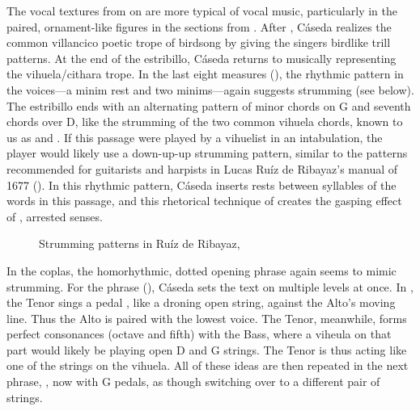 The vocal textures from  on are more typical of vocal music,
particularly in the paired, ornament-like figures in the sections from
.
After , Cáseda realizes the common villancico poetic trope of
birdsong by giving the singers birdlike trill patterns. 
At the end of the estribillo, Cáseda returns to musically representing the
vihuela/cithara trope.
In the last eight measures (), the rhythmic pattern in the
voices---a minim rest and two minims---again suggests strumming (see
 below).
The estribillo ends with an alternating pattern of minor chords on G and
seventh chords over D, like the strumming of the two common vihuela chords,
known to us as  and .
If this passage were played by a vihuelist in an intabulation, the player would
likely use a down-up-up strumming pattern, similar to the patterns recommended
for guitarists and harpists in Lucas Ruíz de Ribayaz's manual  of 1677 ().%
    \Autocite[9]{Ruiz:Luz}
In this rhythmic pattern, Cáseda inserts rests between syllables of the words
in this passage, and this rhetorical technique of  creates the
gasping effect of , arrested senses.


\begin{figure}
    \caption{Strumming patterns in Ruíz de Ribayaz, } 
    \label{fig:Ruiz-strumming}
\end{figure}

In the coplas, the homorhythmic, dotted opening phrase again seems to mimic
strumming.
For the phrase  (),
Cáseda sets the text on multiple levels at once.
In , the Tenor sings a pedal , like a droning open
string, against the Alto's moving line.
Thus the  Alto is paired with the lowest voice.
The Tenor, meanwhile, forms perfect consonances (octave and fifth) with the
Bass, where a viheula on that part would likely be playing open D and G strings. 
The Tenor is thus acting like one of the strings on the vihuela.
All of these ideas are then repeated in the next phrase, , now
with G pedals, as though switching over to a different pair of strings.


